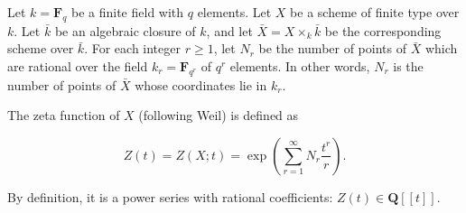 Let $k = \mathbf{F}_q$ be a finite field with $q$ elements. Let $X$ be a scheme of finite type over $k$. Let $\bar{k}$ be an algebraic closure of $k$, and let $\bar{X} = X \times_k \bar{k}$ be the corresponding scheme over $\bar{k}$. For each integer $r \geqslant 1$, let $N_r$ be the number of points of $\bar{X}$ which are rational over the field $k_r = \mathbf{F}_{q^r}$ of $q^r$ elements. In other words, $N_r$ is the number of points of $\bar{X}$ whose coordinates lie in $k_r$.

The zeta function of $X$ (following Weil) is defined as

$$Z(t) = Z(X; t) = \exp \left( \sum_{r=1}^{\infty} N_r \frac{t^r}{r} \right).$$

By definition, it is a power series with rational coefficients: $Z(t) \in \mathbf{Q}[[t]]$.
